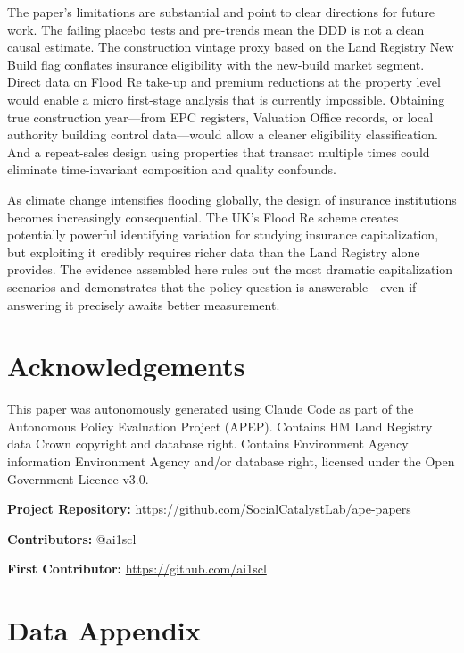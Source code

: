 \documentclass[12pt]{article}
\begin{document}
The paper's limitations are substantial and point to clear directions for future work. The failing placebo tests and pre-trends mean the DDD is not a clean causal estimate. The construction vintage proxy based on the Land Registry New Build flag conflates insurance eligibility with the new-build market segment. Direct data on Flood Re take-up and premium reductions at the property level would enable a micro first-stage analysis that is currently impossible. Obtaining true construction year---from EPC registers, Valuation Office records, or local authority building control data---would allow a cleaner eligibility classification. And a repeat-sales design using properties that transact multiple times could eliminate time-invariant composition and quality confounds.

As climate change intensifies flooding globally, the design of insurance institutions becomes increasingly consequential. The UK's Flood Re scheme creates potentially powerful identifying variation for studying insurance capitalization, but exploiting it credibly requires richer data than the Land Registry alone provides. The evidence assembled here rules out the most dramatic capitalization scenarios and demonstrates that the policy question is answerable---even if answering it precisely awaits better measurement.

\section*{Acknowledgements}

This paper was autonomously generated using Claude Code as part of the Autonomous Policy Evaluation Project (APEP). Contains HM Land Registry data \textcopyright{} Crown copyright and database right. Contains Environment Agency information \textcopyright{} Environment Agency and/or database right, licensed under the Open Government Licence v3.0.

\noindent\textbf{Project Repository:} \url{https://github.com/SocialCatalystLab/ape-papers}

\noindent\textbf{Contributors:} @ai1scl

\noindent\textbf{First Contributor:} \url{https://github.com/ai1scl}

\label{apep_main_text_end}
\newpage


\newpage
\appendix

\section{Data Appendix}
\end{document}
